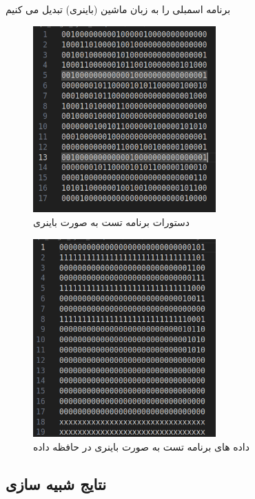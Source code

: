 \documentclass[11pt, a4paper]{article}
\begin{document}
	برنامه اسمبلی را به زبان ماشین (باینری) تبدیل می کنیم
	\begin{figure}[H]
		\begin{center}
			\includegraphics[width=7cm]{Photos/2.png}
		\end{center}
		\caption{دستورات برنامه تست به صورت باینری}
		\label{Inst_Mem}
	\end{figure}
	
	\begin{figure}[H]
		\begin{center}
			\includegraphics[width=7cm]{Photos/3.png}
		\end{center}
		\caption{داده های برنامه تست به صورت باینری در حافظه داده}
		\label{Data_Mem}
	\end{figure}
	
	
	\subsection{نتایج شبیه سازی}
	
\end{document}
